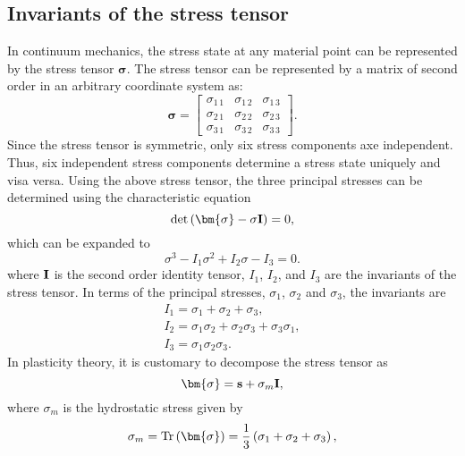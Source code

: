 \subsection{Invariants of the stress tensor}
\noindent
In continuum mechanics, the stress state at any material point can be represented by the stress tensor $\bm{\sigma}$.
The stress tensor can be represented by a matrix of second order in an arbitrary coordinate system as:
\begin{equation}
\bm{\sigma} =
  \begin{bmatrix}
    \sigma_{1\,1}& \sigma_{1\,2}& \sigma_{1\,3}\\
    \sigma_{2\,1}& \sigma_{2\,2}& \sigma_{2\,3}\\
    \sigma_{3\,1}& \sigma_{3\,2}& \sigma_{3\,3}
  \end{bmatrix}.
\end{equation}
Since the stress tensor is symmetric, only six stress components axe independent.
Thus, six independent stress components determine a stress state uniquely and visa versa.
Using the above stress tensor, the three principal stresses can be determined using the characteristic equation
\begin{equation}
\det \left( {{\bm{\sigma }} - \sigma {\bf{I}}} \right) = 0,
\end{equation}
which can be expanded to
\begin{equation}
{\sigma ^3} - {I_1}{\sigma ^2} + {I_2}\sigma  - {I_3} = 0.
\end{equation}
where $\bf{I}$ is the second order identity tensor, ${I_1}$, ${I_2}$, and ${I_3}$ are the invariants of the stress tensor.
In terms of the principal stresses, $\sigma_1$, $\sigma_2$ and $\sigma_3$, the invariants are
\begin{equation}
\begin{array}{*{20}{l}}
{{I_1} = {\sigma _1} + {\sigma _2} + {\sigma _3}},\\
{{I_2} = {\sigma _1}{\sigma _2} + {\sigma _2}{\sigma _3} + {\sigma _3}{\sigma _1}},\\
{{I_3} = {\sigma _1}{\sigma _2}{\sigma _3}}.
\end{array}
\end{equation}
In plasticity theory, it is customary to decompose the stress tensor as
\begin{equation}
{\bm{\sigma }} = {\bf{s}} + {\sigma _m}{\bf{I}},
\end{equation}
where $\sigma_m$ is the hydrostatic stress given by
\begin{equation}
{\sigma _m} = {\rm{Tr}}\left( {\bm{\sigma }} \right) = \frac{1}{3}\left( {{\sigma _1} + {\sigma _2} + {\sigma _3}} \right),
\end{equation}
